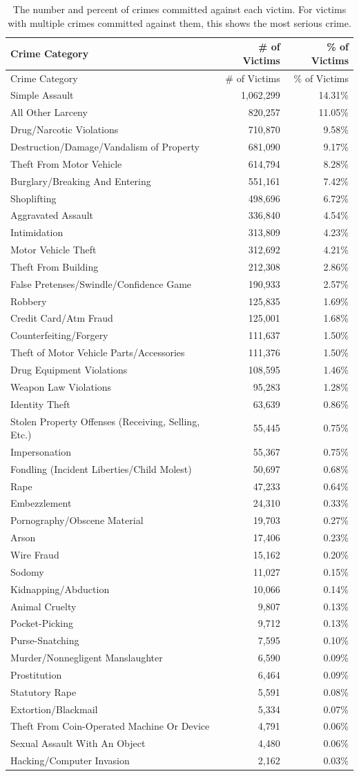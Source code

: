 \documentclass[
  12pt,
  openany]{book}
\begin{document}
\begin{longtable}[]{@{}lrr@{}}
\caption{\label{tab:victimCrimeCategory}The number and percent of crimes committed against each victim. For victims with multiple crimes committed against them, this shows the most serious crime.}\tabularnewline
\toprule
Crime Category & \# of Victims & \% of Victims\tabularnewline
\midrule
\endfirsthead
\toprule
Crime Category & \# of Victims & \% of Victims\tabularnewline
\midrule
\endhead
Simple Assault & 1,062,299 & 14.31\%\tabularnewline
All Other Larceny & 820,257 & 11.05\%\tabularnewline
Drug/Narcotic Violations & 710,870 & 9.58\%\tabularnewline
Destruction/Damage/Vandalism of Property & 681,090 & 9.17\%\tabularnewline
Theft From Motor Vehicle & 614,794 & 8.28\%\tabularnewline
Burglary/Breaking And Entering & 551,161 & 7.42\%\tabularnewline
Shoplifting & 498,696 & 6.72\%\tabularnewline
Aggravated Assault & 336,840 & 4.54\%\tabularnewline
Intimidation & 313,809 & 4.23\%\tabularnewline
Motor Vehicle Theft & 312,692 & 4.21\%\tabularnewline
Theft From Building & 212,308 & 2.86\%\tabularnewline
False Pretenses/Swindle/Confidence Game & 190,933 & 2.57\%\tabularnewline
Robbery & 125,835 & 1.69\%\tabularnewline
Credit Card/Atm Fraud & 125,001 & 1.68\%\tabularnewline
Counterfeiting/Forgery & 111,637 & 1.50\%\tabularnewline
Theft of Motor Vehicle Parts/Accessories & 111,376 & 1.50\%\tabularnewline
Drug Equipment Violations & 108,595 & 1.46\%\tabularnewline
Weapon Law Violations & 95,283 & 1.28\%\tabularnewline
Identity Theft & 63,639 & 0.86\%\tabularnewline
Stolen Property Offenses (Receiving, Selling, Etc.) & 55,445 & 0.75\%\tabularnewline
Impersonation & 55,367 & 0.75\%\tabularnewline
Fondling (Incident Liberties/Child Molest) & 50,697 & 0.68\%\tabularnewline
Rape & 47,233 & 0.64\%\tabularnewline
Embezzlement & 24,310 & 0.33\%\tabularnewline
Pornography/Obscene Material & 19,703 & 0.27\%\tabularnewline
Arson & 17,406 & 0.23\%\tabularnewline
Wire Fraud & 15,162 & 0.20\%\tabularnewline
Sodomy & 11,027 & 0.15\%\tabularnewline
Kidnapping/Abduction & 10,066 & 0.14\%\tabularnewline
Animal Cruelty & 9,807 & 0.13\%\tabularnewline
Pocket-Picking & 9,712 & 0.13\%\tabularnewline
Purse-Snatching & 7,595 & 0.10\%\tabularnewline
Murder/Nonnegligent Manslaughter & 6,590 & 0.09\%\tabularnewline
Prostitution & 6,464 & 0.09\%\tabularnewline
Statutory Rape & 5,591 & 0.08\%\tabularnewline
Extortion/Blackmail & 5,334 & 0.07\%\tabularnewline
Theft From Coin-Operated Machine Or Device & 4,791 & 0.06\%\tabularnewline
Sexual Assault With An Object & 4,480 & 0.06\%\tabularnewline
Hacking/Computer Invasion & 2,162 & 0.03\%\tabularnewline

\end{longtable}
\end{document}

